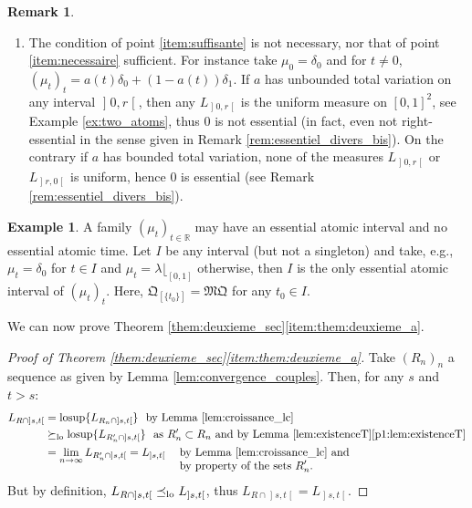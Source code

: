 \documentclass[JEP,XML,SOM,Unicode,NoEqCountersInSection,NoFloatCountersInSection,published]{cedram}
\theoremstyle{plain}
\theoremstyle{definition}
\newtheorem{rem}[them]{Remark}
\newtheorem{ex}[them]{Example}
\newcommand{\como}{\mathfrak{Q}}
\newcommand{\mq}{\mathfrak{MQ}}
\newcommand{\la}{\lambda}
\newcommand{\R}{\mathbb{R}}
\newcommand{\lcsup}{\operatorname{losup}}
\newcommand{\op}{\mathopen}
\newcommand{\clo}{\mathclose}
\newcommand{\leqlc}{\preceq_{\rm lo}}
\newcommand{\geqlc}{\succeq_{\rm lo}}
\begin{document}
\begin{rem}
\begin{enumerate}
\item
The condition of point \eqref{item:suffisante} is not necessary, nor that of point \eqref{item:necessaire} sufficient. For instance take $\mu_0=\delta_0$ and for $t\neq0$, $(\mu_t)_t=a(t)\delta_0+(1-a(t))\delta_1$. If $a$ has unbounded total variation on any interval $\op]0,r\clo[$, then any $L_{\op]0,r\clo[}$ is the uniform measure on $[0,1]^2$, see Example \ref{ex:two_atoms}, thus $0$ is not essential (in fact, even not right-essential in the sense given in Remark \ref{rem:essentiel_divers_bis}). On the contrary if $a$ has bounded total variation, none of the measures $L_{\op]0,r\clo[}$ or $L_{\op]r,0\clo[}$ is uniform, hence $0$ is essential (see Remark \ref{rem:essentiel_divers_bis}).
\end{enumerate}
\end{rem}

\begin{ex}\label{ex:intervalle_essentiel}A family $(\mu_t)_{t\in\R}$ may have an essential atomic interval and no essential atomic time. Let $I$ be any interval (but not a singleton) and take, e.g., $\mu_t=\delta_0$ for $t\in I$ and $\mu_t=\la\lfloor_{[0,1]}$ otherwise, then $I$ is the only essential atomic interval of $(\mu_t)_t$. Here, $\como_{[\{t_0\}]}=\mq$ for any $t_0\in I$.
\end{ex}

We can now prove Theorem \ref{them:deuxieme_sec}\eqref{item:them:deuxieme_a}.

\begin{proof}[Proof of Theorem \ref{them:deuxieme_sec}\eqref{item:them:deuxieme_a}]\label{proof:themBa} Take $(R_n)_n$ a sequence as given by Lemma \ref{lem:convergence_couples}. Then, for any $s$ and $t>s$:
\begin{align*}
L_{R\cap\op]s,t\clo[}&=\lcsup\{L_{R_n\cap\op]s,t\clo[}\}\ \ \text{by Lemma \ref{lem:croissance_lc}}\\
&\geqlc\lcsup\{L_{R'_n\cap\op]s,t\clo[}\}\ \ \text{as $R'_n\subset R_n$ and by Lemma \ref{lem:existenceT}\eqref{p1:lem:existenceT}}\\
&=\lim_{n\to\infty}L_{R'_n\cap\op]s,t\clo[}=L_{\op]s,t\clo[}\ \ \text{\begin{tabular}[t]{l}by Lemma \ref{lem:croissance_lc} and\\ by property of the sets $R'_n$.\end{tabular}}
\end{align*}
But by definition, $L_{R\cap\op]s,t\clo[}\leqlc L_{\op]s,t\clo[}$, thus $L_{R\cap\op]s,t\clo[}= L_{\op]s,t\clo[}$.
\end{proof}
\end{document}

